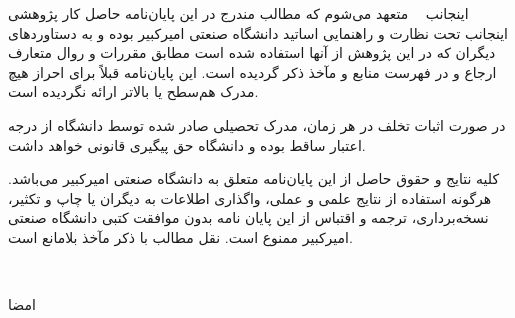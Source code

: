\vspace*{2.5cm}

اينجانب {\bf{\fname\ \lname}} متعهد می‌شوم که مطالب مندرج در این پایان‌نامه حاصل کار پژوهشی اینجانب تحت نظارت و راهنمایی اساتید دانشگاه صنعتی امیرکبیر بوده و به دستاوردهای دیگران که در این پژوهش از آنها استفاده شده است مطابق مقررات و روال متعارف ارجاع و در فهرست منابع و مآخذ ذکر گردیده است. این پایان‌نامه قبلاً برای احراز هیچ مدرک هم‌سطح یا بالاتر ارائه نگردیده است.

در صورت اثبات تخلف در هر زمان، مدرک تحصیلی صادر شده توسط دانشگاه از درجه اعتبار ساقط بوده و دانشگاه حق پیگیری قانونی خواهد داشت.


کلیه نتایج و حقوق حاصل از این پایان‌نامه متعلق به دانشگاه صنعتی امیرکبیر می‌باشد. هرگونه استفاده از نتایج علمی و عملی، واگذاری اطلاعات به دیگران یا چاپ و تکثیر، نسخه‌برداری، ترجمه و اقتباس از این پایان نامه بدون موافقت کتبی دانشگاه صنعتی امیرکبیر ممنوع است. 
نقل مطالب با ذکر مآخذ بلامانع است.\\
\vspace{2.5cm}


{\centerline {\bf{\fname\ \lname}}}
\vspace*{.2cm}
{\centerline{امضا}}
